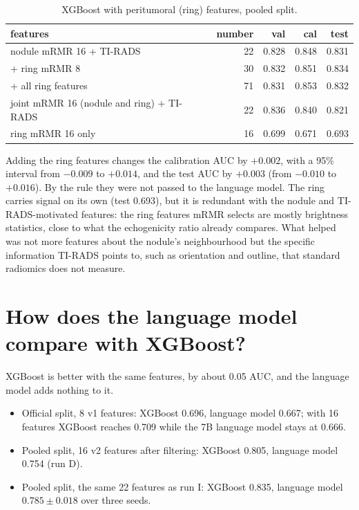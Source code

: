 \begin{table}[ht]
  \centering
  \small
  \caption{XGBoost with peritumoral (ring) features, pooled split.}
  \label{tab:results-peri}
  \begin{tabular}{lrrrr}
    \toprule
    features & number & val & cal & test \\
    \midrule
    nodule mRMR 16 + TI-RADS                    & 22 & 0.828 & 0.848 & 0.831 \\
    \quad + ring mRMR 8                         & 30 & 0.832 & 0.851 & 0.834 \\
    \quad + all ring features                   & 71 & 0.831 & 0.853 & 0.832 \\
    joint mRMR 16 (nodule and ring) + TI-RADS   & 22 & 0.836 & 0.840 & 0.821 \\
    ring mRMR 16 only                           & 16 & 0.699 & 0.671 & 0.693 \\
    \bottomrule
  \end{tabular}
\end{table}

Adding the ring features changes the calibration AUC by $+0.002$, with a 95\% interval from
$-0.009$ to $+0.014$, and the test AUC by $+0.003$ (from $-0.010$ to $+0.016$). By the rule they
were not passed to the language model. The ring carries signal on its own (test 0.693), but it is redundant with the nodule and
TI-RADS-motivated features: the ring features mRMR selects are mostly brightness statistics, close
to what the echogenicity ratio already compares. What helped was not more features about the
nodule's neighbourhood but the specific information TI-RADS points to, such as orientation and
outline, that standard radiomics does not measure.

\section{How does the language model compare with XGBoost?}
\label{sec:results-xgb}

XGBoost is better with the same features, by about 0.05 AUC, and the language model adds nothing
to it.

\begin{itemize}
  \item Official split, 8 v1 features: XGBoost 0.696, language model 0.667; with 16 features
        XGBoost reaches 0.709 while the 7B language model stays at 0.666.
  \item Pooled split, 16 v2 features after filtering: XGBoost 0.805, language model 0.754
        (run D).
  \item Pooled split, the same 22 features as run I: XGBoost 0.835, language model
        $0.785 \pm 0.018$ over three seeds.
\end{itemize}

